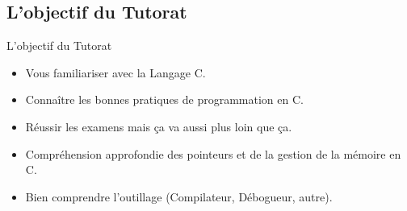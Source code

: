 \subsection{L'objectif du Tutorat}

\begin{frame}{L'objectif du Tutorat}
	\begin{itemize}
		\item Vous familiariser avec la Langage C.
		\item Connaître les bonnes pratiques de programmation en C.
		\item Réussir les examens mais ça va aussi plus loin que ça.
		\item Compréhension approfondie des pointeurs et de la gestion de la mémoire en C.
		\item Bien comprendre l'outillage (Compilateur, Débogueur, autre).
	\end{itemize}
\end{frame}

